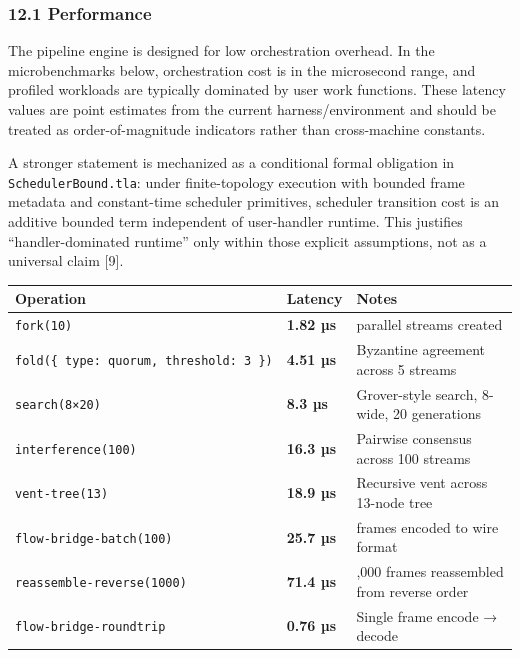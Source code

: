 \documentclass[
  11pt,
]{article}
\newcounter{none} %
\begin{document}
\subsubsection{12.1 Performance}\label{performance}

The pipeline engine is designed for low orchestration overhead. In the
microbenchmarks below, orchestration cost is in the microsecond range,
and profiled workloads are typically dominated by user work functions.
These latency values are point estimates from the current
harness/environment and should be treated as order-of-magnitude
indicators rather than cross-machine constants.

A stronger statement is mechanized as a conditional formal obligation in
\texttt{SchedulerBound.tla}: under finite-topology execution with
bounded frame metadata and constant-time scheduler primitives, scheduler
transition cost is an additive bounded term independent of user-handler
runtime. This justifies ``handler-dominated runtime'' only within those
explicit assumptions, not as a universal claim {[}9{]}.

{\def\LTcaptype{none} %
\begin{longtable}[]{@{}
  >{\raggedright\arraybackslash}p{}
  >{\raggedright\arraybackslash}p{}
  >{\raggedright\arraybackslash}p{}@{}}
\toprule\noalign{}
\begin{minipage}[b]{\linewidth}\raggedright
Operation
\end{minipage} & \begin{minipage}[b]{\linewidth}\raggedright
Latency
\end{minipage} & \begin{minipage}[b]{\linewidth}\raggedright
Notes
\end{minipage} \\
\midrule\noalign{}
\endhead
\bottomrule\noalign{}
\endlastfoot
\texttt{fork(10)} & \textbf{1.82 µs} & parallel streams created \\
\texttt{fold(\{\ type:\ \textquotesingle{}quorum\textquotesingle{},\ threshold:\ 3\ \})}
& \textbf{4.51 µs} & Byzantine agreement across 5 streams \\
\texttt{search(8×20)} & \textbf{8.3 µs} & Grover-style search, 8-wide,
20 generations \\
\texttt{interference(100)} & \textbf{16.3 µs} & Pairwise consensus
across 100 streams \\
\texttt{vent-tree(13)} & \textbf{18.9 µs} & Recursive vent across
13-node tree \\
\texttt{flow-bridge-batch(100)} & \textbf{25.7 µs} & frames encoded to
wire format \\
\texttt{reassemble-reverse(1000)} & \textbf{71.4 µs} & 1,000 frames
reassembled from reverse order \\
\texttt{flow-bridge-roundtrip} & \textbf{0.76 µs} & Single frame encode
→ decode \\
\end{longtable}
}
\end{document}
